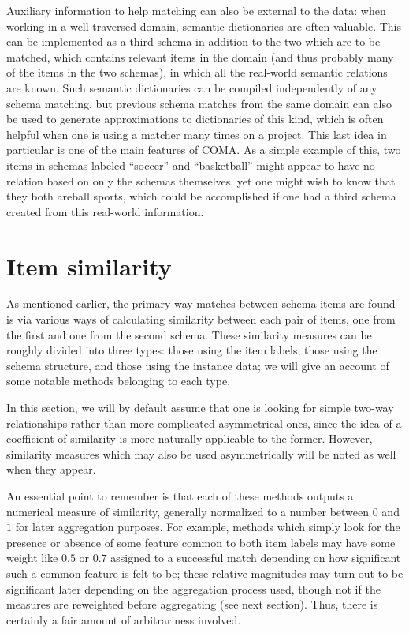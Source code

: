 \documentclass{datamade}
\theoremstyle{definition}
\theoremstyle{remark}
\begin{document}
Auxiliary information to help matching can also be external to the data: when working in a well-traversed domain, semantic dictionaries are often valuable. This can be implemented as a third schema in addition to the two which are to be matched, which contains relevant items in the domain (and thus probably many of the items in the two schemas), in which all the real-world semantic relations are known. Such semantic dictionaries can be compiled independently of any schema matching, but previous schema matches from the same domain can also be used to generate approximations to dictionaries of this kind, which is often helpful when one is using a matcher many times on a project. This last idea in particular is one of the main features of COMA. As a simple example of this, two items in schemas labeled ``soccer'' and ``basketball'' might appear to have no relation based on only the schemas themselves, yet one might wish to know that they both areball sports, which could be accomplished if one had a third schema created from this real-world information.

\section{Item similarity}

As mentioned earlier, the primary way matches between schema items are found is via various ways of calculating similarity between each pair of items, one from the first and one from the second schema. These similarity measures can be roughly divided into three types: those using the item labels, those using the schema structure, and those using the instance data; we will give an account of some notable methods belonging to each type. 

In this section, we will by default assume that one is looking for simple two-way relationships rather than more complicated asymmetrical ones, since the idea of a coefficient of similarity is more naturally applicable to the former. However, similarity measures which may also be used asymmetrically will be noted as well when they appear.

An essential point to remember is that each of these methods outputs a numerical measure of similarity, generally normalized to a number between $0$ and $1$ for later aggregation purposes. For example, methods which simply look for the presence or absence of some feature common to both item labels may have some weight like $0.5$ or $0.7$ assigned to a successful match depending on how significant such a common feature is felt to be; these relative magnitudes may turn out to be significant later depending on the aggregation process used, though not if the measures are reweighted before aggregating (see next section). Thus, there is certainly a fair amount of arbitrariness involved.
\end{document}
